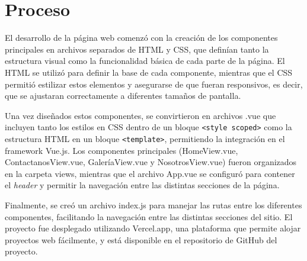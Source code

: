     \section{Proceso}
        El desarrollo de la página web comenzó con la creación de los componentes principales en archivos separados de HTML y CSS, que definían tanto la estructura visual como la funcionalidad básica de cada parte de la página. El HTML se utilizó para definir la base de cada componente, mientras que el CSS permitió estilizar estos elementos y asegurarse de que fueran responsivos, es decir, que se ajustaran correctamente a diferentes tamaños de pantalla.\par
        Una vez diseñados estos componentes, se convirtieron en archivos .vue que incluyen tanto los estilos en CSS dentro de un bloque \texttt{<style scoped>} como la estructura HTML en un bloque \texttt{<template>}, permitiendo la integración en el framework Vue.js. Los componentes principales (HomeView.vue, ContactanosView.vue, GaleríaView.vue y NosotrosView.vue) fueron organizados en la carpeta views, mientras que el archivo App.vue se configuró para contener el \textit{header} y permitir la navegación entre las distintas secciones de la página.\par
        Finalmente, se creó un archivo index.js para manejar las rutas entre los diferentes componentes, facilitando la navegación entre las distintas secciones del sitio. El proyecto fue desplegado utilizando Vercel.app, una plataforma que permite alojar proyectos web fácilmente, y está disponible en el repositorio de GitHub del proyecto.\par